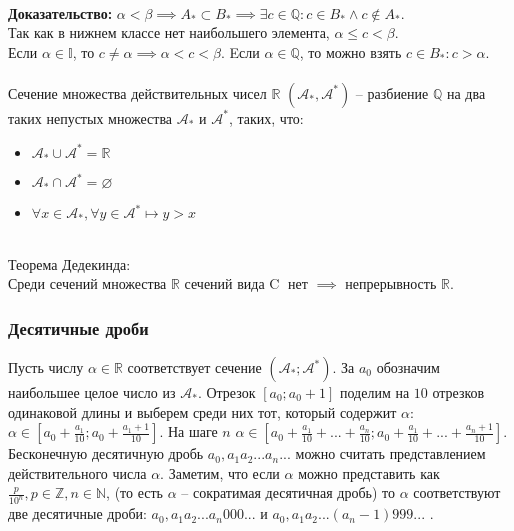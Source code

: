 \documentclass{article}
\begin{document}
        \\
        \textbf{Доказательство:}
        $\alpha < \beta \implies A_* \subset B_* \implies \exists c \in \mathbb{Q}: c \in B_* \wedge c \notin A_*$.
        \\
        Так как в нижнем классе нет наибольшего элемента, $\alpha \le c < \beta$.
        \\
        Если $\alpha \in \mathbb{I}$, то $c \neq \alpha \implies \alpha < c < \beta$.
        Eсли $\alpha \in \mathbb{Q}$, то можно взять $c \in B_*: c > \alpha$. 
        \\
        \\
        Сечение множества действительных чисел $\mathbb{R}$ $(\mathcal{A_*}, \mathcal{A^*})$ --
        разбиение $\mathbb{Q}$ на два таких непустых множества $\mathcal{A_*}$ и $\mathcal{A^*}$, таких, что:
        \begin{itemize}
            \item $\mathcal{A_*} \cup \mathcal{A^*} = \mathbb{R}$
            \item $\mathcal{A_*} \cap \mathcal{A^*} = \varnothing$
            \item $\forall x \in \mathcal{A_*}, \forall y \in \mathcal{A^*} \longmapsto y > x$
        \end{itemize}
        \mbox{}
        \\
        Теорема Дедекинда:
        \\
        Среди сечений множества $\mathbb{R}$ сечений вида {\large \textcircled{\small C}} нет $\implies$ непрерывность $\mathbb{R}$.

        \subsubsection*{Десятичные дроби}
        Пусть числу $\alpha \in \mathbb{R}$ соответствует сечение $(\mathcal{A_*};\mathcal{A^*})$. За $a_0$ обозначим наибольшее целое число из $\mathcal{A_*}$.
        Отрезок $[a_0;a_0 + 1]$ поделим на $10$ отрезков одинаковой длины и выберем среди них тот, который содержит $\alpha$:
        $\alpha \in [a_0 + \frac{a_1}{10};a_0 + \frac{a_1 + 1}{10}]$.
        На шаге $n$ $\alpha \in [a_0 + \frac{a_1}{10} + ... + \frac{a_n}{10};a_0 + \frac{a_1}{10} + ... + \frac{a_n + 1}{10}]$.
        Бесконечную десятичную дробь $a_0,a_1a_2...a_n...$ можно считать представлением действительного числа $\alpha$.
        Заметим, что если $\alpha$ можно представить как $\frac{p}{10^n}, p \in \mathbb{Z}, n \in \mathbb{N}$, (то есть $\alpha$ -- сократимая десятичная дробь)
        то $\alpha$ соответствуют две десятичные дроби: $a_0,a_1a_2...a_n000...$ и $a_0,a_1a_2...(a_n - 1)999...$ .
        
\end{document}

